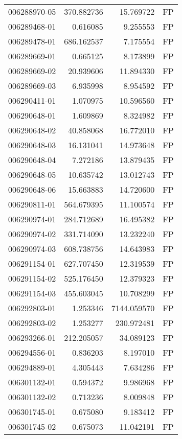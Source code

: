 \begin{tabular}{lrrl}
006288970-05 &  370.882736 &    15.769722 &   FP \\
006289468-01 &    0.616085 &     9.255553 &   FP \\
006289478-01 &  686.162537 &     7.175554 &   FP \\
006289669-01 &    0.665125 &     8.173899 &   FP \\
006289669-02 &   20.939606 &    11.894330 &   FP \\
006289669-03 &    6.935998 &     8.954592 &   FP \\
006290411-01 &    1.070975 &    10.596560 &   FP \\
006290648-01 &    1.609869 &     8.324982 &   FP \\
006290648-02 &   40.858068 &    16.772010 &   FP \\
006290648-03 &   16.131041 &    14.973648 &   FP \\
006290648-04 &    7.272186 &    13.879435 &   FP \\
006290648-05 &   10.635742 &    13.012743 &   FP \\
006290648-06 &   15.663883 &    14.720600 &   FP \\
006290811-01 &  564.679395 &    11.100574 &   FP \\
006290974-01 &  284.712689 &    16.495382 &   FP \\
006290974-02 &  331.714090 &    13.232240 &   FP \\
006290974-03 &  608.738756 &    14.643983 &   FP \\
006291154-01 &  627.707450 &    12.319539 &   FP \\
006291154-02 &  525.176450 &    12.379323 &   FP \\
006291154-03 &  455.603045 &    10.708299 &   FP \\
006292803-01 &    1.253346 &  7144.059570 &   FP \\
006292803-02 &    1.253277 &   230.972481 &   FP \\
006293266-01 &  212.205057 &    34.089123 &   FP \\
006294556-01 &    0.836203 &     8.197010 &   FP \\
006294889-01 &    4.305443 &     7.634286 &   FP \\
006301132-01 &    0.594372 &     9.986968 &   FP \\
006301132-02 &    0.713236 &     8.009848 &   FP \\
006301745-01 &    0.675080 &     9.183412 &   FP \\
006301745-02 &    0.675073 &    11.042191 &   FP \\

\end{tabular}
